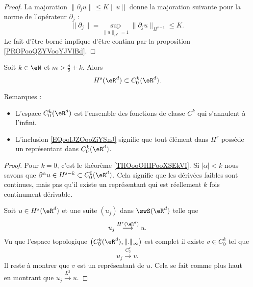 \begin{proof}
    La majoration \( \| \partial_ju \|\leq K\| u \|\) donne la majoration suivante pour la norme de l'opérateur \( \partial_j\) :
    \begin{equation}
        \| \partial_j \|=\sup_{\| u \|_{H^s}=1}\| \partial_ju \|_{H^{s-1}}\leq K.
    \end{equation}
    Le fait d'être borné implique d'être continu par la proposition \ref{PROPooQZYVooYJVlBd}.
\end{proof}

\begin{theorem}
    Soit \( k\in \eN\) et \( m>\frac{ d }{ 2 }+k\). Alors
    \begin{equation}        \label{EQooIJZOooZiYSnJ}
        H^s(\eR^d)\subset C_0^k(\eR^d).
    \end{equation}
\end{theorem}

Remarques :
\begin{itemize}
    \item
        L'espace \( C_0^k(\eR^d)\) est l'ensemble des fonctions de classe \( C^k\) qui s'annulent à l'infini.
    \item 
        L'inclusion \eqref{EQooIJZOooZiYSnJ} signifie que tout élément dans \( H^s\) possède un représentant dans \( C_0^k(\eR^d)\).
\end{itemize}

\begin{proof}
    Pour \( k=0\), c'est le théorème \ref{THOooOHIPooXSEkVI}. Si \( | \alpha |<k\) nous savons que \( \partial^{\alpha}u\in H^{s-k}\subset C_0^0(\eR^d) \). Cela signifie que les dérivées faibles sont continues, mais pas qu'il existe un représentant qui est réellement \( k\) fois continument dérivable.

    Soit \( u\in H^s(\eR^d)\) et une suite \( (u_j)  \) dans \( \swS(\eR^d)\) telle que
    \begin{equation}
        u_j\stackrel{H^s(\eR^d)}{\longrightarrow}u.
    \end{equation}
    Vu que l'espace topologique \( \big( C_0^k(\eR^d),\| . \|_{\infty} \big)\) est complet il existe \( v\in C_0^k\) tel que
    \begin{equation}
        u_j\stackrel{C_0^k}{\longrightarrow}v.
    \end{equation}
    Il reste à montrer que \( v\) est un représentant de \( u\). Cela se fait comme plus haut en montrant que \( u_j\stackrel{L^2}{\longrightarrow}u\).
\end{proof}
